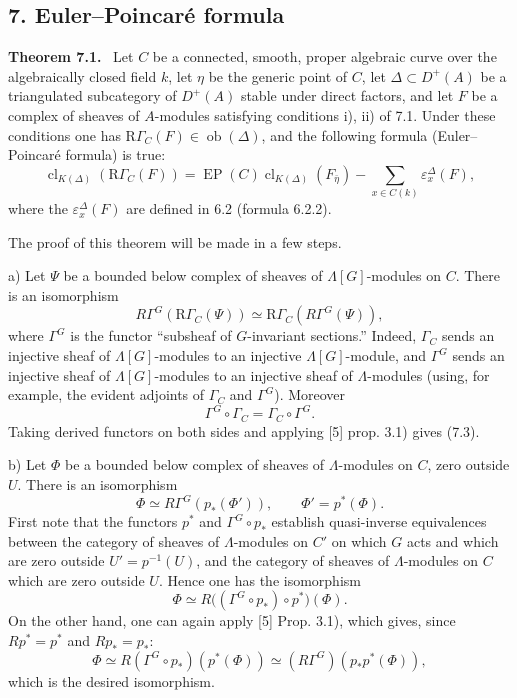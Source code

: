 \documentclass[11pt]{article}
\newenvironment{statement}[1]{\par\medskip\noindent\textbf{#1.}\ }{\par\medskip}
\providecommand{\EP}{\operatorname{EP}}
\providecommand{\Ob}{\operatorname{ob}}
\providecommand{\Ob}{\operatorname{ob}}
\providecommand{\EP}{\operatorname{EP}}
\providecommand{\Ob}{\operatorname{Ob}}
\providecommand{\clK}[1]{\operatorname{cl}_{K(#1)}}
\providecommand{\RG}{\mathrm R\Gamma}
\begin{document}
\subsection*{7. Euler--Poincaré formula}

\begin{statement}{Theorem 7.1}
Let $C$ be a connected, smooth, proper algebraic curve over the algebraically closed field $k$, let $\eta$ be the generic point of $C$, let $\Delta\subset D^+(A)$ be a triangulated subcategory of $D^+(A)$ stable under direct factors, and let $F$ be a complex of sheaves of $A$-modules satisfying conditions i), ii) of 7.1. Under these conditions one has $\RG_C(F)\in\Ob(\Delta)$, and the following formula (Euler--Poincaré formula) is true:
\[
\clK{\Delta}(\RG_C(F))
=
\EP(C)\clK{\Delta}(F_{\bar\eta})
-\sum_{x\in C(k)}\varepsilon_x^\Delta(F),
\tag{7.2}
\]
where the $\varepsilon_x^\Delta(F)$ are defined in 6.2 (formula 6.2.2).
\end{statement}

The proof of this theorem will be made in a few steps.

a) Let $\Psi$ be a bounded below complex of sheaves of $\Lambda[G]$-modules on $C$. There is an isomorphism
\[
R\Gamma^G(\RG_C(\Psi))\simeq\RG_C(R\Gamma^G(\Psi)),
\tag{7.3}
\]
where $\Gamma^G$ is the functor ``subsheaf of $G$-invariant sections.'' Indeed, $\Gamma_C$ sends an injective sheaf of $\Lambda[G]$-modules to an injective $\Lambda[G]$-module, and $\Gamma^G$ sends an injective sheaf of $\Lambda[G]$-modules to an injective sheaf of $\Lambda$-modules (using, for example, the evident adjoints of $\Gamma_C$ and $\Gamma^G$). Moreover
\[
\Gamma^G\circ\Gamma_C=\Gamma_C\circ\Gamma^G.
\]
Taking derived functors on both sides and applying [5] prop. 3.1) gives (7.3).

b) Let $\Phi$ be a bounded below complex of sheaves of $\Lambda$-modules on $C$, zero outside $U$. There is an isomorphism
\[
\Phi\simeq R\Gamma^G(p_*(\Phi')),
\qquad \Phi'=p^*(\Phi).
\tag{7.4}
\]
First note that the functors $p^*$ and $\Gamma^G\circ p_*$ establish quasi-inverse equivalences between the category of sheaves of $\Lambda$-modules on $C'$ on which $G$ acts and which are zero outside $U'=p^{-1}(U)$, and the category of sheaves of $\Lambda$-modules on $C$ which are zero outside $U$. Hence one has the isomorphism
\[
\Phi\simeq R\bigl((\Gamma^G\circ p_*)\circ p^*\bigr)(\Phi).
\]
On the other hand, one can again apply [5] Prop. 3.1), which gives, since $Rp^*=p^*$ and $Rp_*=p_*$:
\[
\Phi\simeq R(\Gamma^G\circ p_*)(p^*(\Phi))
\simeq (R\Gamma^G)(p_*p^*(\Phi)),
\]
which is the desired isomorphism.
\end{document}
